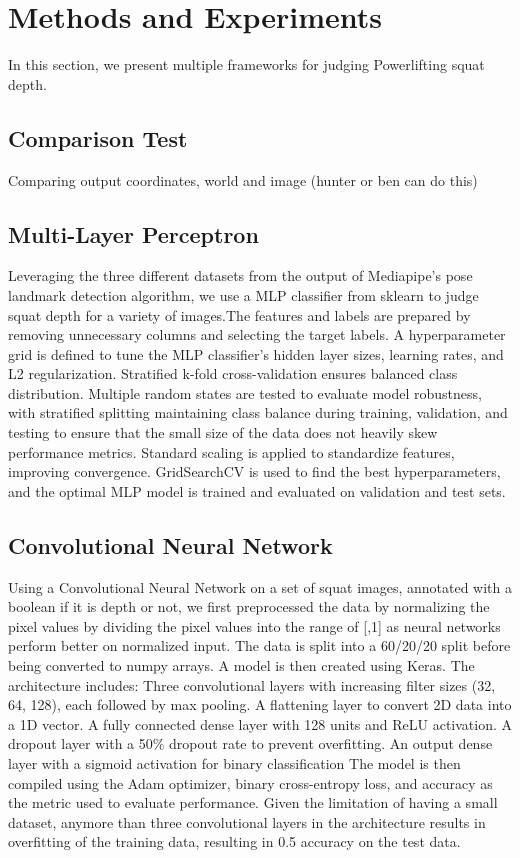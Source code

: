 \section{Methods and Experiments}
\label{sec:formatting}
In this section, we present multiple frameworks for judging Powerlifting squat depth.
\subsection{Comparison Test}
Comparing output coordinates, world and image (hunter or ben can do this)
\subsection{Multi-Layer Perceptron}
Leveraging the three different datasets from the output of Mediapipe's pose landmark detection algorithm, we use a MLP classifier from sklearn to judge squat depth for a variety of images.The features and labels are prepared by removing unnecessary columns and selecting the target labels. A hyperparameter grid is defined to tune the MLP classifier's hidden layer sizes, learning rates, and L2 regularization. Stratified k-fold cross-validation ensures balanced class distribution. Multiple random states are tested to evaluate model robustness, with stratified splitting maintaining class balance during training, validation, and testing to ensure that the small size of the data does not heavily skew performance metrics. Standard scaling is applied to standardize features, improving convergence. GridSearchCV is used to find the best hyperparameters, and the optimal MLP model is trained and evaluated on validation and test sets.
\subsection{Convolutional Neural Network}
Using a Convolutional Neural Network on a set of squat images, annotated with a boolean if it is depth or not, we first preprocessed the data by normalizing the pixel values by dividing the pixel values into the range of [\0,1] as neural networks perform better on normalized input. The data is split into a 60/20/20 split before being converted to numpy arrays. A model is then created using Keras. The architecture includes:
  Three convolutional layers with increasing filter sizes (32, 64, 128), each followed by max pooling.
  A flattening layer to convert 2D data into a 1D vector.
  A fully connected dense layer with 128 units and ReLU activation.
  A dropout layer with a 50\% dropout rate to prevent overfitting.
  An output dense layer with a sigmoid activation for binary classification
The model is then compiled using the Adam optimizer, binary cross-entropy loss, and accuracy as the metric used to evaluate performance. Given the limitation of having a small dataset, anymore than three convolutional layers in the architecture results in overfitting of the training data, resulting in 0.5 accuracy on the test data.


